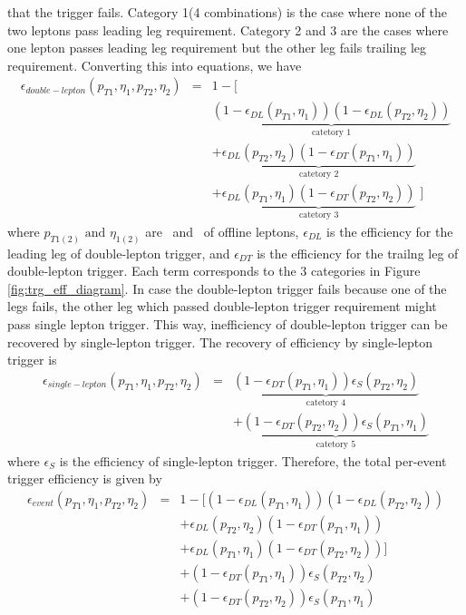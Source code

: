 that the trigger fails. Category 1(4 combinations) is the case where none of the 
two leptons pass leading leg requirement. Category 2 and 3 are the cases where one 
lepton passes leading leg requirement but the other leg fails trailing leg requirement.  
Converting this into equations, we have 
\begin{eqnarray} 
\label{eq:doubletrgeff}
\epsilon_{double-lepton} \left( p_{T1},\eta_1,p_{T2},\eta_2 \right)
&=&    
1 - \Big[   \\ 
& & 
\underbrace{
\left(1 - \epsilon_{DL}\left(p_{T1}, \eta_1\right)\right)
\left(1 - \epsilon_{DL}\left(p_{T2}, \eta_2\right)\right)  
}_\text{catetory 1} \\
& & 
+ \underbrace{
\epsilon_{DL}\left(p_{T2}, \eta_2\right)\left(1 - \epsilon_{DT}\left(p_{T1}, \eta_1\right)\right)
}_\text{catetory 2} \\
& &
+ \underbrace{
\epsilon_{DL}\left(p_{T1}, \eta_1\right)\left(1 - \epsilon_{DT}\left(p_{T2}, \eta_2\right)\right) 
}_\text{catetory 3}
\,\, \Big]
\end{eqnarray} 
where $p_{T1(2)} \textrm{ and } \eta_{1(2)}$ are \pt~and \Eta~of offline leptons, 
$\epsilon_{DL}$ is the efficiency for the leading leg of double-lepton trigger, 
and $\epsilon_{DT}$ is the efficiency for the trailng leg of double-lepton trigger. 
Each term corresponds to the 3 categories in Figure \ref{fig:trg_eff_diagram}.
In case the double-lepton trigger fails because one of the legs fails, the other leg 
which passed double-lepton trigger requirement might pass single lepton trigger. 
This way, inefficiency of double-lepton trigger can be recovered by single-lepton trigger.
The recovery of efficiency by single-lepton trigger is  
\begin{eqnarray} 
\label{eq:singletrgeff}
\epsilon_{single-lepton} \left( p_{T1},\eta_1,p_{T2},\eta_2 \right)
&=&    
\underbrace{
\left(1 - \epsilon_{DT}\left(p_{T1}, \eta_1\right)\right)
\epsilon_{S}\left(p_{T2}, \eta_2\right)  
}_\text{catetory 4} \\
& & 
+ \underbrace{
\left(1 - \epsilon_{DT}\left(p_{T2}, \eta_2\right)\right)
\epsilon_{S}\left(p_{T1}, \eta_1\right)  
}_\text{catetory 5} 
\end{eqnarray}
where $\epsilon_{S}$ is the efficiency of single-lepton trigger. 
Therefore, the total per-event trigger efficiency is given by 
\begin{eqnarray} 
\label{eq:doubletrgeff}
\epsilon_{event} \left( p_{T1},\eta_1,p_{T2},\eta_2 \right)
&=&    
1 - \Big[    
\left(1 - \epsilon_{DL}\left(p_{T1}, \eta_1\right)\right)
\left(1 - \epsilon_{DL}\left(p_{T2}, \eta_2\right)\right)  \\ 
& & 
+ \epsilon_{DL}\left(p_{T2}, \eta_2\right)\left(1 - \epsilon_{DT}\left(p_{T1}, \eta_1\right)\right) \\
& &
+ \epsilon_{DL}\left(p_{T1}, \eta_1\right)\left(1 - \epsilon_{DT}\left(p_{T2}, \eta_2\right)\right)  
\Big] \\
& &
+ \left(1 - \epsilon_{DT}\left(p_{T1}, \eta_1\right)\right)
\epsilon_{S}\left(p_{T2}, \eta_2\right)  \\ 
& & 
+ \left(1 - \epsilon_{DT}\left(p_{T2}, \eta_2\right)\right)
\epsilon_{S}\left(p_{T1}, \eta_1\right)  
\end{eqnarray} 

